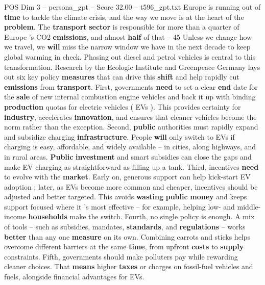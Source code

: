 \begin{textsample}{POS Dim 3 – persona\_gpt – Score 32.00 – t596\_gpt.txt}  \label{ex:f3_pos_024}
Europe is running out of \textbf{time} to tackle the climate crisis, and the way we move is at the heart of the \textbf{problem}.
The \textbf{transport} \textbf{sector} is responsible for more than a quarter of Europe ’s CO2 \textbf{emissions}, and almost \textbf{half} of that – 45 %
Unless we change how we travel, we \textbf{will} miss the narrow window we have in the next decade to keep global warming in check.
Phasing out diesel and petrol vehicles is central to this transformation.
Research by the Ecologic Institute and Greenpeace Germany lays out six key policy \textbf{measures} that can drive this \textbf{shift} and help rapidly cut \textbf{emissions} from \textbf{transport}.
First, governments \textbf{need} to set a clear \textbf{end} date for the \textbf{sale} of new internal combustion engine vehicles and back it up with binding \textbf{production} quotas for electric vehicles ( EVs ).
This provides certainty for \textbf{industry}, accelerates \textbf{innovation}, and ensures that cleaner vehicles become the norm rather than the exception.
Second, \textbf{public} authorities must rapidly expand and subsidize charging \textbf{infrastructure}.
People \textbf{will} only switch to EVs if charging is easy, affordable, and widely available – in cities, along highways, and in rural areas. \textbf{Public} \textbf{investment} and smart subsidies can close the gaps and make EV charging as straightforward as filling up a tank.
Third, incentives \textbf{need} to evolve with the \textbf{market}.
Early on, generous support can help kick-start EV adoption ; later, as EVs become more common and cheaper, incentives should be adjusted and better targeted.
This avoids \textbf{wasting} \textbf{public} \textbf{money} and keeps support focused where it ’s most effective – for example, helping low- and middle-income \textbf{households} make the switch.
Fourth, no single policy is enough.
A mix of tools – such as subsidies, mandates, \textbf{standards}, and \textbf{regulations} – works \textbf{better} than any one \textbf{measure} on its own.
Combining carrots and sticks helps overcome different barriers at the same \textbf{time}, from upfront \textbf{costs} to \textbf{supply} constraints.
Fifth, governments should make polluters pay while rewarding cleaner choices.
That \textbf{means} higher \textbf{taxes} or charges on fossil-fuel vehicles and fuels, alongside financial advantages for EVs.

\end{textsample}
